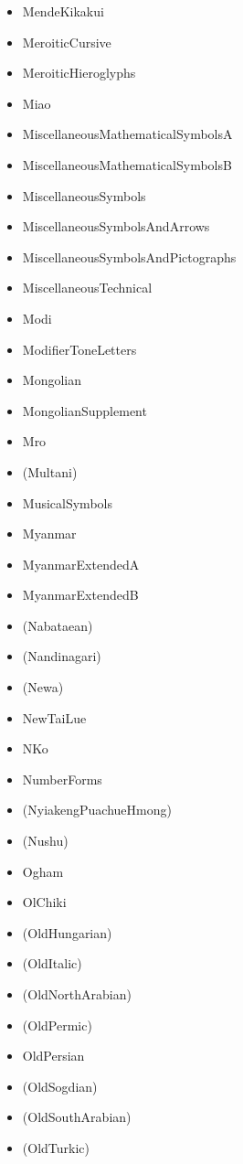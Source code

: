 \documentclass{article}
\newenvironment{itemlist}{%
  \begin{itemize}
  \setlength{\itemsep}{0pt}
  \setlength{\parsep}{0pt}
  \setlength{\topsep}{0pt}
  \setlength{\partopsep}{0pt}
  \setlength{\parskip}{0pt}
  \setlength{\labelsep}{5pt}}%
{
  \end{itemize}}
\begin{document}
\begin{multicols*}{2}
\begin{itemlist}
        \item MendeKikakui
        \item MeroiticCursive
        \item MeroiticHieroglyphs
        \item Miao
        \item MiscellaneousMathematicalSymbolsA
        \item MiscellaneousMathematicalSymbolsB
        \item MiscellaneousSymbols
        \item MiscellaneousSymbolsAndArrows
        \item MiscellaneousSymbolsAndPictographs
        \item MiscellaneousTechnical
        \item Modi
        \item ModifierToneLetters
        \item Mongolian
        \item MongolianSupplement
        \item Mro
        \item (Multani)
        \item MusicalSymbols
        \item Myanmar
        \item MyanmarExtendedA
        \item MyanmarExtendedB
        \item (Nabataean)
        \item (Nandinagari)
        \item (Newa)
        \item NewTaiLue
        \item NKo
        \item NumberForms
        \item (NyiakengPuachueHmong)
        \item (Nushu)
        \item Ogham
        \item OlChiki
        \item (OldHungarian)
        \item (OldItalic)
        \item (OldNorthArabian)
        \item (OldPermic)
        \item OldPersian
        \item (OldSogdian)
        \item (OldSouthArabian)
        \item (OldTurkic)

\end{itemlist}
\end{multicols*}
\end{document}
